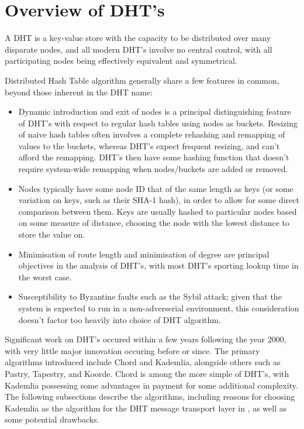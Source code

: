 \documentclass[10pt, a4paper]{article}
\begin{document}
\section{Overview of DHT's}

A DHT is a key-value store with the capacity to be distributed over many disparate nodes, and all modern DHT's involve no central control, with all participating nodes being effectively equivalent and symmetrical.

Distributed Hash Table algorithm generally share a few features in common, beyond those inherent in the DHT name:
\begin{itemize}
	\item Dynamic introduction and exit of nodes is a principal distinguishing feature of DHT's with respect to regular hash tables using nodes as buckets.
		Resizing of naive hash tables often involves a complete rehashing and remapping of values to the buckets, whereas DHT's expect frequent resizing, and can't afford the remapping.
		DHT's then have some hashing function that doesn't require system-wide remapping when nodes/buckets are added or removed.
	\item Nodes typically have some node ID that of the same length as keys (or some variation on keys, such as their SHA-1 hash), in order to allow for some direct comparison between them. Keys are usually hashed to particular nodes based on some measure of distance, choosing the node with the lowest distance to store the value on.
	\item Minimisation of route length and minimisation of degree are principal objectives in the analysis of DHT's, with most DHT's sporting  lookup time in the worst case.
	\item Susceptibility to Byzantine faults such as the Sybil attack; given that the \lsr{} system is expected to run in a non-adverserial environment, this consideration doesn't factor too heavily into choice of DHT algorithm.
\end{itemize}

Significant work on DHT's occured within a few years following the year 2000, with very little major innovation occuring before or since.
The primary algorithms introduced include Chord and Kademlia, alongside others such as Pastry, Tapestry, and Koorde.
Chord is among the more simple of DHT's, with Kademlia possessing some advantages in payment for some additional complexity.
The following subsections describe the algorithms, including reasons for choosing Kademlia as the algorithm for the DHT message transport layer in \lsr{}, as well as some potential drawbacks.
\end{document}
